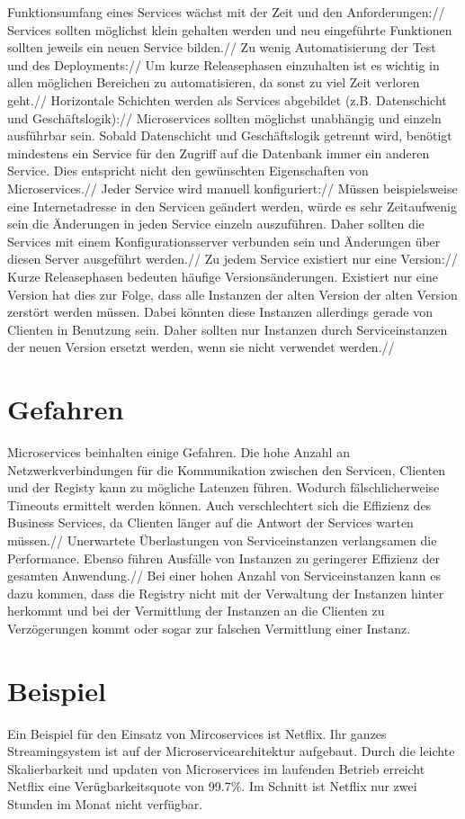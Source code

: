 Funktionsumfang eines Services wächst mit der Zeit und den Anforderungen://
Services sollten möglichst klein gehalten werden und neu eingeführte Funktionen sollten jeweils ein neuen Service bilden.//
Zu wenig Automatisierung der Test und des Deployments://
Um kurze Releasephasen einzuhalten ist es wichtig in allen möglichen Bereichen zu automatisieren, da sonst zu viel Zeit verloren geht.//
Horizontale Schichten werden als Services abgebildet (z.B. Datenschicht und Geschäftslogik)://
Microservices sollten möglichst unabhängig und einzeln ausführbar sein. Sobald Datenschicht und Geschäftslogik getrennt wird, benötigt mindestens ein Service für den Zugriff auf die Datenbank immer ein anderen Service. Dies entspricht nicht den gewünschten Eigenschaften von Microservices.//
Jeder Service wird manuell konfiguriert://
Müssen beispielsweise eine Internetadresse in den Servicen geändert werden, würde es sehr Zeitaufwenig sein die Änderungen in jeden Service einzeln auszuführen. Daher sollten die Services mit einem Konfigurationsserver verbunden sein und Änderungen über diesen Server ausgeführt werden.//
Zu jedem Service existiert nur eine Version://
Kurze Releasephasen bedeuten häufige Versionsänderungen. Existiert nur eine Version hat dies zur Folge, dass alle Instanzen der alten Version der alten Version zerstört werden müssen. Dabei könnten diese Instanzen allerdings gerade von Clienten in Benutzung sein. Daher sollten nur Instanzen durch Serviceinstanzen der neuen Version ersetzt werden, wenn sie nicht verwendet werden.//




\section{Gefahren}

Microservices beinhalten einige Gefahren. Die hohe Anzahl an Netzwerkverbindungen für die Kommunikation zwischen den Servicen, Clienten und der Registy kann zu mögliche Latenzen führen. Wodurch fälschlicherweise Timeouts ermittelt werden können. Auch verschlechtert sich die Effizienz des Business Services, da Clienten länger auf die Antwort der Services warten müssen.//
Unerwartete Überlastungen von Serviceinstanzen verlangsamen die Performance. Ebenso führen Ausfälle von Instanzen zu geringerer Effizienz der gesamten Anwendung.//
Bei einer hohen Anzahl von Serviceinstanzen kann es dazu kommen, dass die Registry nicht mit der Verwaltung der Instanzen hinter herkommt und bei der Vermittlung der Instanzen an die Clienten zu Verzögerungen kommt oder sogar zur falschen Vermittlung einer Instanz.

\section{Beispiel}

Ein Beispiel für den Einsatz von Mircoservices ist Netflix. Ihr ganzes Streamingsystem ist auf der Microservicearchitektur aufgebaut. Durch die leichte Skalierbarkeit und updaten von Microservices im laufenden Betrieb erreicht Netflix eine Verügbarkeitsquote von 99.7\%. Im Schnitt ist Netflix nur zwei Stunden im Monat nicht verfügbar.  